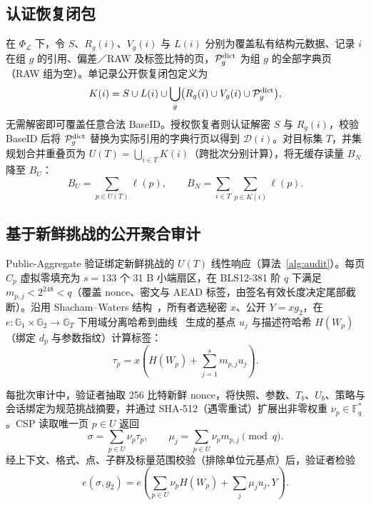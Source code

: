 \documentclass[10pt,journal]{IEEEtran}
\begin{document}
\subsection{认证恢复闭包}\label{sec:c2}
在 $\Phi_{\mathcal L}$ 下，令 $S$、$R_g(i)$、$V_g(i)$ 与 $L(i)$ 分别为覆盖私有结构元数据、记录 $i$ 在组 $g$ 的引用、偏差／RAW 及标签比特的页，$\mathcal P_g^{\rm dict}$ 为组 $g$ 的全部字典页（RAW 组为空）。单记录公开恢复闭包定义为
\begin{equation}\label{eq:closure}
K(i)=S\cup L(i)\cup\bigcup_g
\bigl(R_g(i)\cup V_g(i)\cup\mathcal P_g^{\rm dict}\bigr),
\end{equation}
无需解密即可覆盖任意合法 BaseID。授权恢复者则认证解密 $S$ 与 $R_g(i)$，校验 BaseID 后将 $\mathcal P_g^{\rm dict}$ 替换为实际引用的字典行页以得到 $\mathcal D(i)$。对目标集 $T$，并集规划合并重叠页为 $U(T)=\bigcup_{i\in T}K(i)$（跨批次分别计算），将无缓存读量 $B_N$ 降至 $B_U$：
\begin{equation}\label{eq:reads}
B_U=\sum_{p\in U(T)}\ell(p),\qquad
B_N=\sum_{i\in T}\sum_{p\in K(i)}\ell(p).
\end{equation}

\subsection{基于新鲜挑战的公开聚合审计}\label{sec:audit}
Public-Aggregate 验证绑定新鲜挑战的 $U(T)$ 线性响应（算法~\ref{alg:audit}）。每页 $C_p$ 虚拟零填充为 $s=133$ 个 31 B 小端扇区，在 BLS12-381 阶 $q$ 下满足 $m_{p,j}<2^{248}<q$（覆盖 nonce、密文与 AEAD 标签，由签名有效长度决定尾部截断）。沿用 Shacham--Waters 结构~\cite{ShachamWaters2013}，所有者选秘密 $x$、公开 $Y=xg_2$，在 $e:\mathbb G_1\times\mathbb G_2\to\mathbb G_T$ 下用域分离哈希到曲线~\cite{RFC9380} 生成的基点 $u_j$ 与描述符哈希 $H(W_p)$（绑定 $d_p$ 与参数指纹）计算标签：
\begin{equation}\label{eq:tag}
\tau_p=x\left(H(W_p)+\sum_{j=1}^{s}m_{p,j}u_j\right).
\end{equation}

每批次审计中，验证者抽取 256 比特新鲜 nonce，将快照、参数、$T_b$、$U_b$、策略与会话绑定为规范挑战摘要，并通过 SHA-512（遇零重试）扩展出非零权重 $\nu_p\in\mathbb F_q^*$。CSP 读取唯一页 $p\in U$ 返回
\begin{equation}\label{eq:aggregate}
\sigma=\sum_{p\in U}\nu_p\tau_p,\qquad
\mu_j=\sum_{p\in U}\nu_pm_{p,j}\pmod q.
\end{equation}
经上下文、格式、点、子群及标量范围校验（排除单位元基点）后，验证者检验
\begin{equation}\label{eq:pairing}
e(\sigma,g_2)=e\left(\sum_{p\in U}\nu_pH(W_p)+\sum_j\mu_ju_j,Y\right).
\end{equation}
\end{document}
